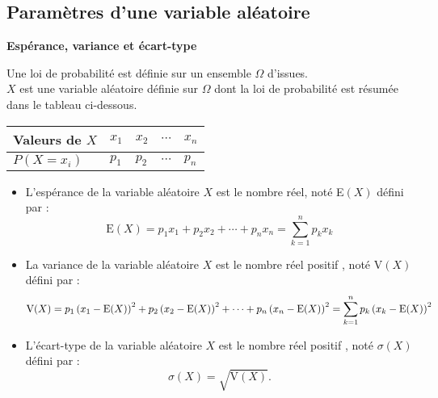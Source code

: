 \subsection{Paramètres d'une variable aléatoire}
\textbf{Espérance, variance et écart-type}
 \begin{definition}
 Une loi de probabilité est définie sur un ensemble $ \Omega $  d'issues.\\ $ X $  est une variable aléatoire  définie sur $ \Omega $ dont la loi de probabilité est résumée dans le tableau ci-dessous.
\bigskip

\begin{tabularx}{\textwidth}{|X|X|X|X|X|}
\hline
Valeurs de $ X$ &$ x_{1}$& $x_{2}$ &$\cdots$  &$x_{n}$\\
\hline
$ P(X=x_{i}) $ & $ p_{1} $& $ p_{2} $  &$\cdots  $ & $ p_{n} $\\
\hline
\end{tabularx}


\begin{itemize}
\item L'espérance de la variable aléatoire $ X $  est le nombre réel, noté E$ (X) $  défini par :
  \[ \text{E}(X)=p_{1}x_{1} + p_{2}x_{2} +\cdots + p_{n}x_{n} =\displaystyle \sum_{k=1}^n p_{k}x_{k} \]
  
   \item  La variance  de la variable aléatoire $ X $  est le nombre réel  positif , noté V$ (X) $  défini par :
  \[ \text{V}(X)=p_{1}\left(x_{1}-\text{E}(X)\right)^{2} + p_{2}\left(x_{2}-\text{E}(X)\right)^{2} +\cdots + p_{n}\left(x_{n}-\text{E}(X)\right)^{2} =\displaystyle\sum_{k=1}^n p_{k}\left(x_{k}-\text{E}(X)\right)^{2}\]
\item L'écart-type  de la variable aléatoire $ X $  est le nombre réel  positif , noté $ \sigma(X) $  défini par :$$ \sigma(X)=\sqrt{\text{V}(X)}.$$
 \end{itemize}
\end{definition}


